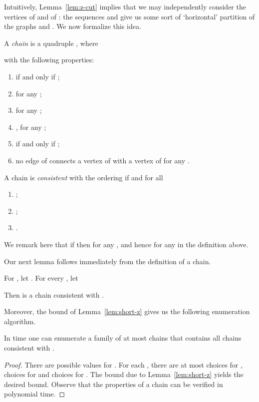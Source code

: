 Intuitively, Lemma~\ref{lem:z-cut} implies that we may independently consider the vertices of
 and of : the sequences  and 
give us some sort of `horizontal' partition of the graphs  and .
We now formalize this idea.

\begin{definition}[chain]
A \emph{chain} is a quadruple , where

with the following properties:
\begin{enumerate}
\item  if and only if ;
\item  for any ;
\item  for any ;
\item , for any ;
\item  if and only if ;
\item no edge of  connects a vertex of  with a vertex
of  for any .
\end{enumerate}
A chain  is \emph{consistent} with the ordering 
if  and for all 
\begin{enumerate}
\item ;
\item ;
\item .
\end{enumerate}
\end{definition}

We remark here that if  then  for any , and hence  
for any  in the definition above.

Our next lemma follows immediately  from the definition of a chain.
\begin{lemma}\label{lem:ord-to-chain}
For  , let . For every , let 

Then  is a chain consistent with .

\end{lemma}

Moreover, the bound of Lemma~\ref{lem:short-z} gives us the following enumeration algorithm.
\begin{theorem}\label{thm:chain-enum}
In  time one can enumerate a family 
of at most  chains that contains all chains consistent with .
\end{theorem}
\begin{proof}
There are  possible values for .
For each , there are at most  choices for ,
 choices for  and  choices for .
The bound  due to Lemma~\ref{lem:short-z} yields the desired bound.
Observe that the properties of a chain can be verified in polynomial time.
\end{proof}

